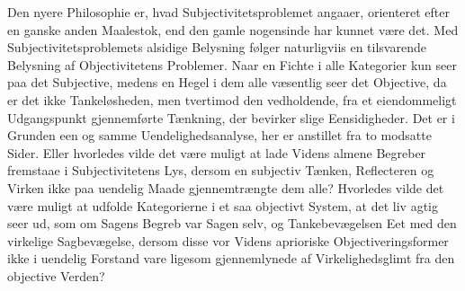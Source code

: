 \documentclass[11pt]{book}
\newcommand{\opage}[1]{\marginnote{\footnotesize\textit{[#1]}}}
\begin{document}
Den nyere Philosophie er, hvad Subjectivitetsproblemet angaaer,
orienteret efter en ganske anden Maalestok, end den gamle nogensinde har
kunnet være det. Med Subjectivitetsproblemets alsidige Belysning følger
naturligviis en tilsvarende Belysning af Objectivitetens Problemer. Naar
en Fichte i alle Kategorier kun seer paa det Subjective, medens en Hegel
i dem alle væsentlig seer det Objective, da er det ikke Tankeløsheden,
men tvertimod den vedholdende, fra et eiendommeligt Udgangspunkt
gjennemførte Tænkning, der bevirker slige Eensidigheder. Det er i
Grunden een og samme Uendelighedsanalyse, her er anstillet fra to
modsatte Sider. Eller hvorledes vilde det være muligt at lade Videns
almene Begreber fremstaae i Subjectivitetens Lys, dersom en subjectiv
Tænken, Reflecteren og Virken ikke paa uendelig Maade gjennemtrængte dem
alle? Hvorledes vilde det være muligt at udfolde Kategorierne i et saa
objectivt System, at det liv\-%
\opage{232} \setcounter{footnote}{0}%
agtig seer ud, som om Sagens Begreb var Sagen selv, og
Tankebevægelsen Eet med den virkelige Sagbevægelse, dersom disse vor
Videns aprioriske Objectiveringsformer ikke i uendelig Forstand vare
ligesom gjennemlynede af Virkelighedsglimt fra den objective Verden?
\end{document}
